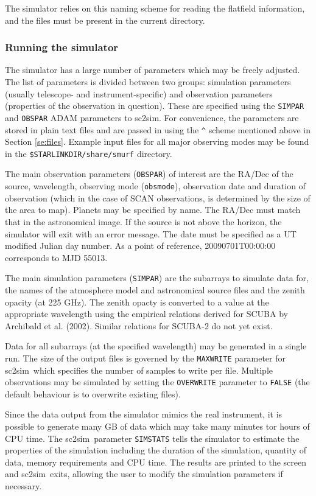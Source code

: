 \documentclass[twoside,11pt]{article}
\newcommand{\xref}[3]{#1}
\renewcommand{\_}{\texttt{\symbol{95}}}
\newcommand{\task}[1]{\textsf{#1}}
\newcommand{\sctwosim}{\xref{\task{sc2sim}}{sun258}{SC2SIM}}
\begin{document}
The simulator relies on this naming scheme for reading the flatfield
information, and the files must be present in the current directory.

\subsubsection{Running the simulator}

The simulator has a large number of parameters which may be freely
adjusted. The list of parameters is divided between two groups:
simulation parameters (usually telescope- and instrument-specific) and
observation parameters (properties of the observation in
question). These are specified using the \texttt{SIMPAR} and
\texttt{OBSPAR} ADAM parameters to \sctwosim. For convenience, the
parameters are stored in plain text files and are passed in using the
\verb+^+ scheme mentioned above in Section \ref{se:files}. Example
input files for all major observing modes may be found in the
\texttt{\$STARLINK\_DIR/share/smurf} directory.

The main observation parameters (\texttt{OBSPAR}) of interest are the
RA/Dec of the source, wavelength, observing mode (\texttt{obsmode}),
observation date and duration of observation (which in the case of
SCAN observations, is determined by the size of the area to
map). Planets may be specified by name. The RA/Dec must match that in
the astronomical image. If the source is not above the horizon, the
simulator will exit with an error message. The date must be specified
as a UT modified Julian day number. As a point of reference,
20090701T00:00:00 corresponds to MJD 55013.

The main simulation parameters (\texttt{SIMPAR}) are the subarrays to
simulate data for, the names of the atmosphere model and astronomical
source files and the zenith opacity (at 225 GHz). The zenith opacty is
converted to a value at the appropriate wavelength using the empirical
relations derived for SCUBA by Archibald et al. (2002). Similar
relations for SCUBA-2 do not yet exist.

Data for all subarrays (at the specified wavelength) may be generated
in a single run. The size of the output files is governed by the
\texttt{MAXWRITE} parameter for \sctwosim\ which specifies the number
of samples to write per file. Multiple observations may be simulated
by setting the \texttt{OVERWRITE} parameter to \texttt{FALSE} (the
default behaviour is to overwrite existing files).

Since the data output from the simulator mimics the real instrument,
it is possible to generate many GB of data which may take many minutes
tor hours of CPU time. The \sctwosim\ parameter \texttt{SIMSTATS}
tells the simulator to estimate the properties of the simulation
including the duration of the simulation, quantity of data, memory
requirements and CPU time. The results are printed to the screen and
\sctwosim\ exits, allowing the user to modify the simulation
parameters if necessary.
\end{document}
